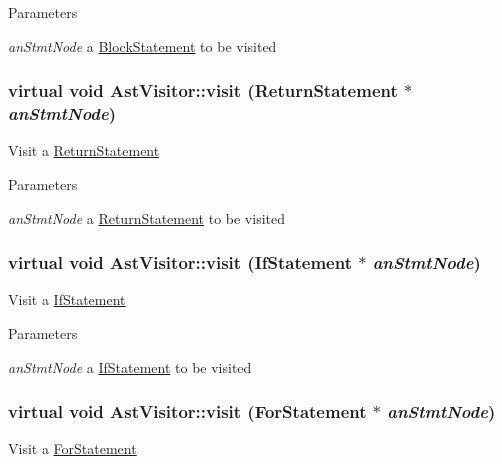 \begin{DoxyParams}{Parameters}
\item[{\em anStmtNode}]a \hyperlink{classBlockStatement}{BlockStatement} to be visited \end{DoxyParams}
\hypertarget{classAstVisitor_a67d9b772dd6c8c7d0b95f13f06a94fcd}{
\subsubsection[{visit}]{\setlength{\rightskip}{0pt plus 5cm}virtual void AstVisitor::visit ({\bf ReturnStatement} $\ast$ {\em anStmtNode})}}
\label{classAstVisitor_a67d9b772dd6c8c7d0b95f13f06a94fcd}
Visit a \hyperlink{classReturnStatement}{ReturnStatement}


\begin{DoxyParams}{Parameters}
\item[{\em anStmtNode}]a \hyperlink{classReturnStatement}{ReturnStatement} to be visited \end{DoxyParams}
\hypertarget{classAstVisitor_a013c3bcd69e558c3b5a1d129d7943dc3}{
\subsubsection[{visit}]{\setlength{\rightskip}{0pt plus 5cm}virtual void AstVisitor::visit ({\bf IfStatement} $\ast$ {\em anStmtNode})}}
\label{classAstVisitor_a013c3bcd69e558c3b5a1d129d7943dc3}
Visit a \hyperlink{classIfStatement}{IfStatement}


\begin{DoxyParams}{Parameters}
\item[{\em anStmtNode}]a \hyperlink{classIfStatement}{IfStatement} to be visited \end{DoxyParams}
\hypertarget{classAstVisitor_a04ab246b6b4f982075744cb79d9e3d83}{
\subsubsection[{visit}]{\setlength{\rightskip}{0pt plus 5cm}virtual void AstVisitor::visit ({\bf ForStatement} $\ast$ {\em anStmtNode})}}
\label{classAstVisitor_a04ab246b6b4f982075744cb79d9e3d83}
Visit a \hyperlink{classForStatement}{ForStatement}


